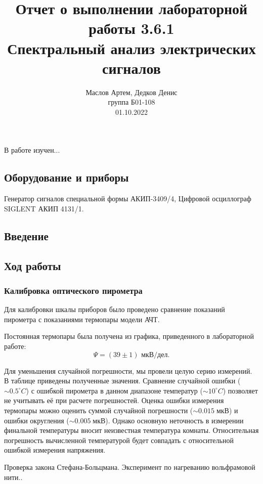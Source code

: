 \documentclass[12pt,a4paper]{article}
\author{\normalsize Маслов Артем, Дедков Денис \\
	\normalsize группа Б01-108 \\
	\normalsize 01.10.2022}
\date{}
\title{
	\large Отчет о выполнении лабораторной работы 3.6.1 \\
	\Large Спектральный анализ электрических сигналов \\ 
	
}
\begin{document}
\maketitle
\subsection*{} В работе изучен...

\subsection*{Оборудование и приборы} Генератор сигналов специальной формы
АКИП-3409/4, Цифровой осциллограф SIGLENT АКИП 4131/1.

\subsection*{Введение}

\subsection*{Ход работы}

\subsubsection*{Калибровка оптического пирометра}

Для калибровки шкалы приборов было проведено сравнение показаний пирометра с показаниями термопары модели АЧТ. 

Постоянная термопары была получена из графика, приведенного в лабораторной работе:
$$\Psi = (39 \pm 1) \text{ мкВ/дел.}$$

Для уменьшения случайной погрешности, мы провели целую серию измерений. В таблице приведены полученные значения. Сравнение случайной ошибки ($\sim0.5^\circ C$) с ошибкой пирометра в данном диапазоне температур ($\sim10^\circ C$) позволяет не учитывать её при расчете погрешностей. Оценка ошибки измерения термопары можно оценить суммой случайной погрешности ($\sim0.015\;\text{мкВ}$) и ошибки округления ($\sim0.005\;\text{мкВ}$). Однако основную неточность в измерении финальной температуры вносит неизвестная температура комнаты. Относительная погрешность вычисленной температурой будет совпадать с относительной ошибкой измерения напряжения. 

\begin{table}[H]
	\addtolength{\tabcolsep}{-4pt}
	\footnotesize
	
	
	\caption{Проверка закона Стефана-Больцмана. Эксперимент по нагреванию вольфрамовой нити..}
\end{table}
\end{document}
